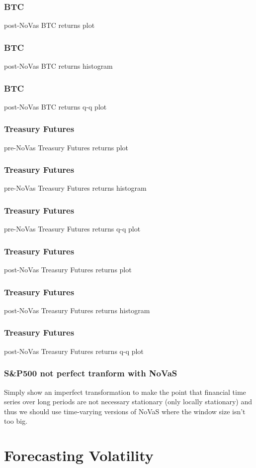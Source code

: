 \documentclass{beamer}
\begin{document}
\begin{frame}
\frametitle{BTC}
post-NoVas BTC returns plot
\end{frame}

\begin{frame}
\frametitle{BTC}
post-NoVas BTC returns histogram
\end{frame}

\begin{frame}
\frametitle{BTC}
post-NoVas BTC returns q-q plot
\end{frame}

\begin{frame}
\frametitle{Treasury Futures}
pre-NoVas Treasury Futures returns plot
\end{frame}

\begin{frame}
\frametitle{Treasury Futures}
pre-NoVas Treasury Futures returns histogram
\end{frame}

\begin{frame}
\frametitle{Treasury Futures}
pre-NoVas Treasury Futures returns q-q plot
\end{frame}

\begin{frame}
\frametitle{Treasury Futures}
post-NoVas Treasury Futures returns plot
\end{frame}

\begin{frame}
\frametitle{Treasury Futures}
post-NoVas Treasury Futures returns histogram
\end{frame}

\begin{frame}
\frametitle{Treasury Futures}
post-NoVas Treasury Futures returns q-q plot
\end{frame}

\begin{frame}
\frametitle{S&P500 not perfect tranform with NoVaS}
Simply show an imperfect transformation to make the point that financial time series over long periods are not necessary stationary (only locally stationary) and thus we should use time-varying versions of NoVaS where the window size isn't too big.
\end{frame}


\section{Forecasting Volatility}
\end{document}
